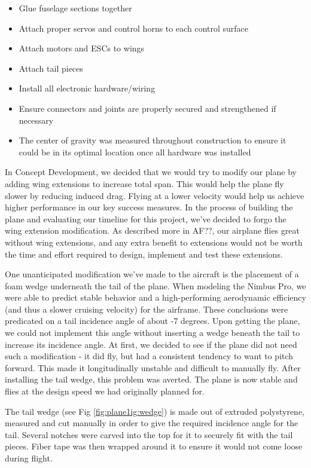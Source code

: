 \documentclass[]{auvsi_doc}
\begin{document}
\begin{itemize}
	\item Glue fuselage sections together
	\item Attach proper servos and control horns to each control surface
	\item Attach motors and ESCs to wings
	\item Attach tail pieces
	\item Install all electronic hardware/wiring
	\item Ensure connectors and joints are properly secured and strengthened if necessary
	\item The center of gravity was measured throughout construction to ensure it could be in its optimal location once all hardware was installed 
\end{itemize}

In Concept Development, we decided that we would try to modify our plane by adding wing extensions to increase total span. This would help the plane fly slower by reducing induced drag. Flying at a lower velocity would help us achieve higher performance in our key success measures. In the process of building the plane and evaluating our timeline for this project, we've decided to forgo the wing extension modification. As described more in AF??, our airplane flies great without wing extensions, and any extra benefit to extensions would not be worth the time and effort required to design, implement and test these extensions.

One unanticipated modification we've made to the aircraft is the placement of a foam wedge underneath the tail of the plane. When modeling the Nimbus Pro, we were able to predict stable behavior and a high-performing aerodynamic efficiency (and thus a slower cruising velocity) for the airframe. These conclusions were predicated on a tail incidence angle of about -7 degrees. Upon getting the plane, we could not implement this angle without inserting a wedge beneath the tail to increase its incidence angle. At first, we decided to see if the plane did not need such a modification - it did fly, but had a consistent tendency to want to pitch forward. This made it longitudinally unstable and difficult to manually fly. After installing the tail wedge, this problem was averted. The plane is now stable and flies at the design speed we had originally planned for.

The tail wedge (see Fig \ref{fig:plane1ig:wedge}) is made out of extruded polystyrene, measured and cut manually in order to give the required incidence angle for the tail. Several notches were carved into the top for it to securely fit with the tail pieces. Fiber tape was then wrapped around it to ensure it would not come loose during flight.
\end{document}
